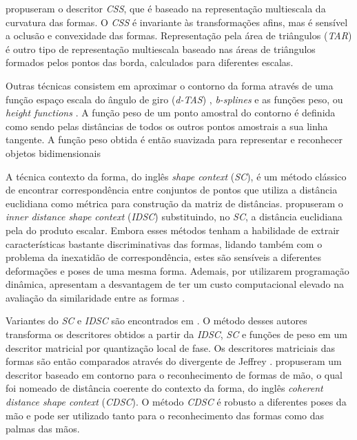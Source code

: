  propuseram o descritor \textit{CSS}, que é baseado na representação multiescala da curvatura das formas. O \textit{CSS} é invariante às transformações afins, mas é sensível a oclusão e convexidade das formas. Representação pela área de triângulos (\textit{TAR}) \cite{Alajlan20117} é outro tipo de representação multiescala baseado nas áreas de triângulos formados pelos pontos das borda, calculados para diferentes escalas. 

Outras técnicas consistem em aproximar o contorno da forma através de uma função espaço escala do ângulo de giro (\textit{d-TAS}) \cite{4202050}, \textit{b-splines} \cite{1168520} e as funções peso, ou \textit{height functions} \cite{Wang2012134}. A função peso de um ponto amostral do contorno é definida como sendo pelas distâncias de todos os outros pontos amostrais a sua linha tangente. A função peso obtida é então suavizada para representar e reconhecer objetos bidimensionais

A técnica contexto da forma, do inglês \textit{shape context} (\textit{SC}), \cite{Belongie:2002} é um método clássico de encontrar correspondência entre conjuntos de pontos que utiliza a distância euclidiana como métrica para construção da matriz de distâncias.  propuseram o \textit{inner distance shape context} (\textit{IDSC}) substituindo, no \textit{SC}, a distância euclidiana pela do produto escalar. Embora esses métodos tenham a habilidade de extrair características bastante discriminativas das formas, lidando também com o problema da inexatidão de correspondência, estes são sensíveis a diferentes deformações e poses de uma mesma forma. Ademais, por utilizarem programação dinâmica, apresentam a desvantagem de ter um custo computacional elevado na avaliação da similaridade entre as formas \cite{FreitasS.TorresMiranda2016}.

Variantes do \textit{SC} e \textit{IDSC} são encontrados em \cite{Nanni20122254}. O método desses autores transforma os descritores obtidos a partir da \textit{IDSC}, \textit{SC} e funções de peso em um descritor matricial por quantização local de fase. Os descritores matriciais das formas são então comparados através do divergente de Jeffrey \cite{Ullah1996}.  propuseram um descritor baseado em contorno para o reconhecimento de formas de mão, o qual foi nomeado de distância coerente do contexto da forma, do inglês \textit{coherent distance shape context} (\textit{CDSC}). O método \textit{CDSC} é robusto a diferentes poses da mão e pode ser utilizado tanto para o reconhecimento das formas como das palmas das mãos.  

